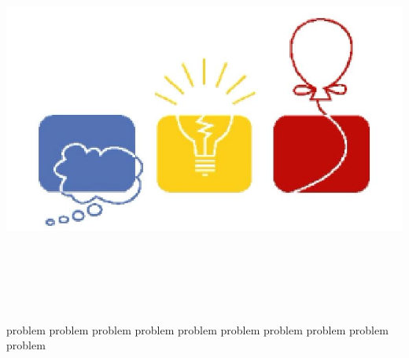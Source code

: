 \documentclass[12pt,a4paper,oneside]{article}
\begin{document}
\includegraphics[width=\textwidth]{icpc.jpg}
\\
\\
\\
\\
\\
\\

\begin{center}
\LARGE{\textbf{}}
\end{center}

\mbox{}\newpage\mbox{}\newpage

{problem}
{problem}
{problem}
{problem}
{problem}
{problem}
{problem}
{problem}
{problem}
{problem}
\end{document}
